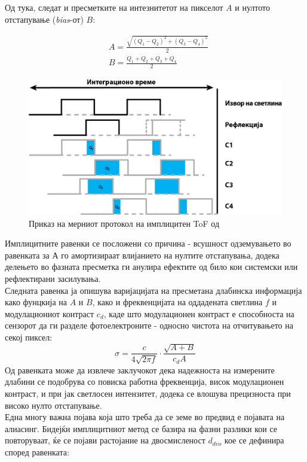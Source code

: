 \documentclass[11pt]{article}
\begin{document}
		Од тука, следат и пресметките на интезнитетот на пикселот $A$ и нултото отстапување (\textit{bias}-от) $B$:

    \begin{align}
        & A = \frac{\sqrt{(Q_1 - Q_2)^2  + (Q_3 - Q_4)^2}}{2} \\
  		  & B = \frac{Q_1 + Q_2 + Q_3 + Q_4}{2}
    \end{align}


		\begin{figure}[H]
			\includegraphics[width=0.75\linewidth]{./images/CWToF.png}
			\centering
			\caption{Приказ на мерниот протокол на имплицитен ToF од \cite{tofwhitepaper}}
			\label{fig:CWToF.png}
			\end{figure}

		Имплицитните равенки се посложени со причина - всушност одземувањето во равенката за А го амортизираат влијанието на нултите отстапувања, додека делењето во фазната пресметка ги анулира ефектите од било кои системски или рефлектирани засилувања.\\ %
		Следната равенка ја опишува варијацијата на пресметана длабинска информација како фунцкија на $A$ и $B$, како и фреквенцијата на оддадената светлина $f$ и модулациониот контраст $c_d$, каде што модулационен контраст е способноста на сензорот да ги разделе фотоелектроните - односно чистота на отчитувањето на секој пиксел:
    \begin{equation}
		  \sigma = \frac{c}{4\sqrt{2\pi f}} \cdot \frac{\sqrt{A+B}}{c_d A}
    \end{equation}
		Од равенката може да извлече заклучокот дека надежноста на измерените длабини се подобрува со повиска работна фреквенција, висок модулационен контраст, и при јак светлосен интензитет, додека се влошува прецизноста при високо нулто отстапување.
		\\
		Една многу важна појава која што треба да се земе во предвид е појавата на алиасинг. Бидејќи имплицитниот метод се базира на фазни разлики кои се повторуваат, ќе се појави растојание на двосмисленост $d_{dvo}$ кое се дефинира според равенката:
\end{document}
